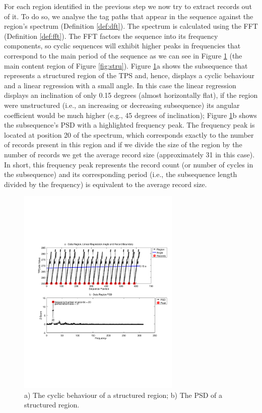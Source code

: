 For each region identified in the previous step we now try to extract records
out of it. To do so, we analyse the tag paths that appear in the sequence
against the region's spectrum (Definition \ref{def:dft}). The spectrum is
calculated using the FFT\cite{fft1965} (Definition \ref{def:fft}).
The FFT factors the sequence into its frequency components, so
cyclic sequences will exhibit higher peaks in frequencies that correspond to the
main period of the sequence as we can see in Figure \ref{fig:fftreg} (the main
content region of Figure \ref{fig:stru}). Figure \ref{fig:fftreg}a shows the
subsequence that represents a structured region of the TPS and, hence, displays
a cyclic behaviour and a linear regression with a small angle. In this case the
linear regression displays an inclination of only 0.15 degrees (almost
horizontally flat), if the region were unstructured (i.e., an increasing or
decreasing subsequence) its angular coefficient would be much higher (e.g., 45
degrees of inclination); Figure \ref{fig:fftreg}b shows the subsequence's PSD
with a highlighted frequency peak. The frequency peak is located at position 20
of the spectrum, which corresponds exactly to the number of records present in
this region and if we divide the size of the region by the number of records we
get the average record size (approximately 31 in this case).
In short, this frequency peak represents the record count (or number of cycles
in the subsequence) and its corresponding period (i.e., the subsequence length
divided by the frequency) is equivalent to the average record size.


\begin{figure}[h]
  \centering
     \includegraphics[trim={2.5cm 7.5cm 1cm 6.5cm}, width=220pt
     ]{img/fftreg.pdf}
  \caption{\small{a) The cyclic behaviour of a structured region; b) The PSD of a structured region.}}
  \label{fig:fftreg}
\end{figure}

